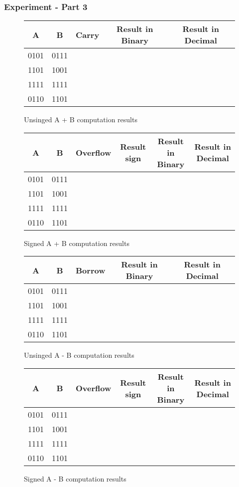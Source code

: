 \documentclass{article}
\begin{document}
\subsubsection{Experiment - Part 3}
\begin{figure}[H]
\centering
\begin{tabular}{|c|c|c|c|c|}
\hline
A & B & Carry & Result in Binary & Result in Decimal \\
\hline
0101 & 0111 & & & \\
1101 & 1001 & & & \\
1111 & 1111 & & & \\
0110 & 1101 & & & \\
\hline
\end{tabular}
\caption{Unsinged A + B computation results}
\end{figure}
\begin{figure}[H]
\centering
\begin{tabular}{|c|c|c|c|c|c|}
\hline
A & B & Overflow & Result sign & Result in Binary & Result in Decimal \\
\hline
0101 & 0111 & & & &\\
1101 & 1001 & & & &\\
1111 & 1111 & & & &\\
0110 & 1101 & & & &\\
\hline
\end{tabular}
\caption{Signed A + B computation results}
\end{figure}
\begin{figure}[H]
\centering
\begin{tabular}{|c|c|c|c|c|}
\hline
A & B & Borrow & Result in Binary & Result in Decimal \\
\hline
0101 & 0111 & & & \\
1101 & 1001 & & & \\
1111 & 1111 & & & \\
0110 & 1101 & & & \\
\hline
\end{tabular}
\caption{Unsinged A - B computation results}
\end{figure}
\begin{figure}[H]
\centering
\begin{tabular}{|c|c|c|c|c|c|}
\hline
A & B & Overflow & Result sign & Result in Binary & Result in Decimal \\
\hline
0101 & 0111 & & & &\\
1101 & 1001 & & & &\\
1111 & 1111 & & & &\\
0110 & 1101 & & & &\\
\hline
\end{tabular}
\caption{Signed A - B computation results}
\end{figure}
\end{document}
